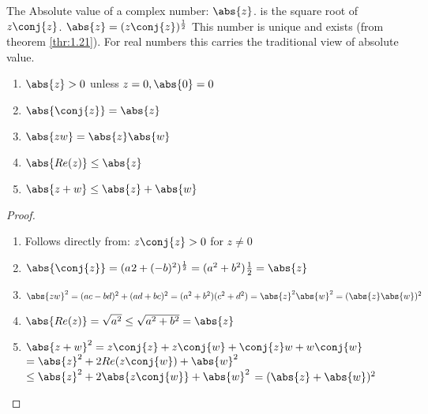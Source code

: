 \documentclass[12pt, letterpaper]{paper}
\begin{document}
The Absolute value of a complex number: $\abs{z}$. is the square root
of $z \conj{z}$. $\abs{z} = ( z \conj{z} )^{\frac{1}{2}}$ This number
is unique and exists (from theorem \ref{thr:1.21}). For real numbers
this carries the traditional view of absolute value.

\begin{theorem}
  \label{thr:1.33}
  \begin{enumerate}
  \item $\abs{z} > 0$ unless $z = 0, \abs{0} = 0$
  \item $\abs{\conj{z}} = \abs{z}$
  \item $\abs{zw} = \abs{z}\abs{w}$
  \item $\abs{Re(z)} \leq \abs{z}$
  \item $\abs{z+w} \leq \abs{z} + \abs{w}$
  \end{enumerate}
\end{theorem}

\begin{proof}
  \begin{enumerate}
  \item Follows directly from: $z \conj{z} > 0$ for $z \neq 0$
  \item
    $\abs{\conj{z}} = ( a^{}2 + (-b)^{2} )^{\frac{1}{2}} = ( a^{2} +
    b^{2})^{}\frac{1}{2} = \abs{z}$
  \item
    $\abs{zw}^2 = (ac-bd)^2 + (ad+bc)^2 = (a^2 + b^2 )(c^2 + d^2) =
    \abs{z}^2 \abs{w}^2 = (\abs{z}\abs{w})^{2}$
  \item
    $\abs{Re(z)} = \sqrt{ a^{2} } \leq \sqrt{ a^{2} + b^{2} } =
    \abs{z}$
  \item
    $\abs{z+w}^{2} = z \conj{z} + z \conj{w} + \conj{z}w + w \conj{w}$
    \newline $= \abs{z}^2 + 2 Re( z \conj{w} ) + \abs{w}^{2}$ \newline
    $\leq \abs{z}^{2} + 2\abs{z \conj{w} } + \abs{w}^{2}$ \newline
    $= ( \abs{z} + \abs{w} )^{2}$
  \end{enumerate}
\end{proof}
\end{document}
